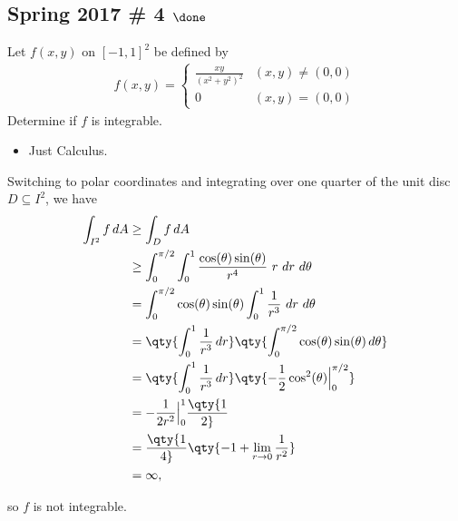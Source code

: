 \hypertarget{spring-2017-4-done}{%
\subsection{\texorpdfstring{Spring 2017 \# 4
\(\done\)}{Spring 2017 \# 4 \textbackslash done}}\label{spring-2017-4-done}}

Let \(f(x, y)\) on \([-1, 1]^2\) be defined by
\begin{align*}
f(x, y) = \begin{cases}
\frac{x y}{\left(x^{2}+y^{2}\right)^{2}} & (x, y) \neq (0, 0) \\
0 & (x, y) = (0, 0)
\end{cases}
\end{align*}
Determine if \(f\) is integrable.

\begin{concept}

\envlist

\begin{itemize}
\tightlist
\item
  Just Calculus.
\end{itemize}

\end{concept}

\begin{solution}

Switching to polar coordinates and integrating over one quarter of the
unit disc \(D \subseteq I^2\), we have
\begin{align*}
\int_{I^2} f \, dA
&\geq \int_D f \, dA \\
&\geq \int_0^{\pi/2} \int_0^1 \frac{\cos(\theta)\sin(\theta)}{r^4} ~r~dr~d\theta  \\
&= \int_0^{\pi/2} \cos(\theta)\sin(\theta) \int_0^1 {1 \over r^3} ~dr~d\theta \\
&= \qty{\int_0^1 {1\over r^3}\,dr} \qty{\int_0^{\pi/2} \cos(\theta)\sin(\theta)\,d\theta  }\\
&= \qty{\int_0^1 {1\over r^3}\,dr} \qty{-{1\over 2}\cos^2(\theta)\Big|_0^{\pi/2}}  \\
&= -{1\over 2r^2}\Big|_0^1 \qty{1\over 2} \\
&= \qty{1\over 4}\qty{ -1 + \lim_{r\to 0} {1\over r^2} } \\
&= \infty
,\end{align*}

so \(f\) is not integrable.

\end{solution}

